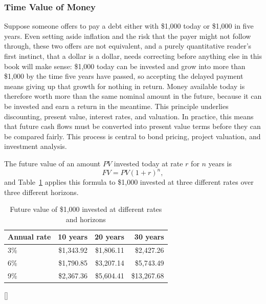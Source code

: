 \documentclass[../ai_in_finance]{subfiles}
\begin{document}
\subsubsection*{Time Value of Money}

Suppose someone offers to pay a debt either with \$1,000 today or \$1,000 in five years. Even setting aside inflation and the risk that the payer might not follow through, these two offers are not equivalent, and a purely quantitative reader's first instinct, that a dollar is a dollar, needs correcting before anything else in this book will make sense: \$1,000 today can be invested and grow into more than \$1,000 by the time five years have passed, so accepting the delayed payment means giving up that growth for nothing in return. Money available today is therefore worth more than the same nominal amount in the future, because it can be invested and earn a return in the meantime. This principle underlies discounting, present value, interest rates, and valuation. In practice, this means that future cash flows must be converted into present value terms before they can be compared fairly. This process is central to bond pricing, project valuation, and investment analysis.

The future value of an amount $PV$ invested today at rate $r$ for $n$ years is
$$FV = PV(1+r)^n,$$
 and Table~\ref{tab:tvm_table} applies this formula to \$1,000 invested at three different rates over three different horizons.

\begin{table}[htbp]
\centering
\begin{lrbox}{\bookmeasuredbox}
\begin{tabular}{lrrr}
\toprule
Annual rate & 10 years & 20 years & 30 years \\
\midrule
3\% & \$1,343.92 & \$1,806.11 & \$2,427.26 \\
6\% & \$1,790.85 & \$3,207.14 & \$5,743.49 \\
9\% & \$2,367.36 & \$5,604.41 & \$13,267.68 \\
\bottomrule
\end{tabular}
\end{lrbox}
\ifdim\wd\bookmeasuredbox<0.65\linewidth
\setlength{\bookcapwidth}{0.65\linewidth}
\else
\setlength{\bookcapwidth}{\wd\bookmeasuredbox}
\fi
{}[\bookcapwidth]{
\usebox{\bookmeasuredbox}
}{
\caption{Future value of \$1,000 invested at different rates and horizons}
\label{tab:tvm_table}
}
\end{table}
\end{document}
